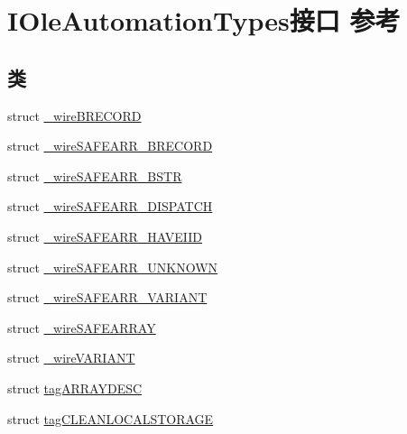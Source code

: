 \hypertarget{interface_i_ole_automation_types}{}\section{I\+Ole\+Automation\+Types接口 参考}
\label{interface_i_ole_automation_types}
\subsection*{类}
\begin{DoxyCompactItemize}
\item 
struct \hyperlink{struct_i_ole_automation_types_1_1__wire_b_r_e_c_o_r_d}{\+\_\+wire\+B\+R\+E\+C\+O\+RD}
\item 
struct \hyperlink{struct_i_ole_automation_types_1_1__wire_s_a_f_e_a_r_r___b_r_e_c_o_r_d}{\+\_\+wire\+S\+A\+F\+E\+A\+R\+R\+\_\+\+B\+R\+E\+C\+O\+RD}
\item 
struct \hyperlink{struct_i_ole_automation_types_1_1__wire_s_a_f_e_a_r_r___b_s_t_r}{\+\_\+wire\+S\+A\+F\+E\+A\+R\+R\+\_\+\+B\+S\+TR}
\item 
struct \hyperlink{struct_i_ole_automation_types_1_1__wire_s_a_f_e_a_r_r___d_i_s_p_a_t_c_h}{\+\_\+wire\+S\+A\+F\+E\+A\+R\+R\+\_\+\+D\+I\+S\+P\+A\+T\+CH}
\item 
struct \hyperlink{struct_i_ole_automation_types_1_1__wire_s_a_f_e_a_r_r___h_a_v_e_i_i_d}{\+\_\+wire\+S\+A\+F\+E\+A\+R\+R\+\_\+\+H\+A\+V\+E\+I\+ID}
\item 
struct \hyperlink{struct_i_ole_automation_types_1_1__wire_s_a_f_e_a_r_r___u_n_k_n_o_w_n}{\+\_\+wire\+S\+A\+F\+E\+A\+R\+R\+\_\+\+U\+N\+K\+N\+O\+WN}
\item 
struct \hyperlink{struct_i_ole_automation_types_1_1__wire_s_a_f_e_a_r_r___v_a_r_i_a_n_t}{\+\_\+wire\+S\+A\+F\+E\+A\+R\+R\+\_\+\+V\+A\+R\+I\+A\+NT}
\item 
struct \hyperlink{struct_i_ole_automation_types_1_1__wire_s_a_f_e_a_r_r_a_y}{\+\_\+wire\+S\+A\+F\+E\+A\+R\+R\+AY}
\item 
struct \hyperlink{struct_i_ole_automation_types_1_1__wire_v_a_r_i_a_n_t}{\+\_\+wire\+V\+A\+R\+I\+A\+NT}
\item 
struct \hyperlink{struct_i_ole_automation_types_1_1tag_a_r_r_a_y_d_e_s_c}{tag\+A\+R\+R\+A\+Y\+D\+E\+SC}
\item 
struct \hyperlink{struct_i_ole_automation_types_1_1tag_c_l_e_a_n_l_o_c_a_l_s_t_o_r_a_g_e}{tag\+C\+L\+E\+A\+N\+L\+O\+C\+A\+L\+S\+T\+O\+R\+A\+GE}
\item 

\end{DoxyCompactItemize}

